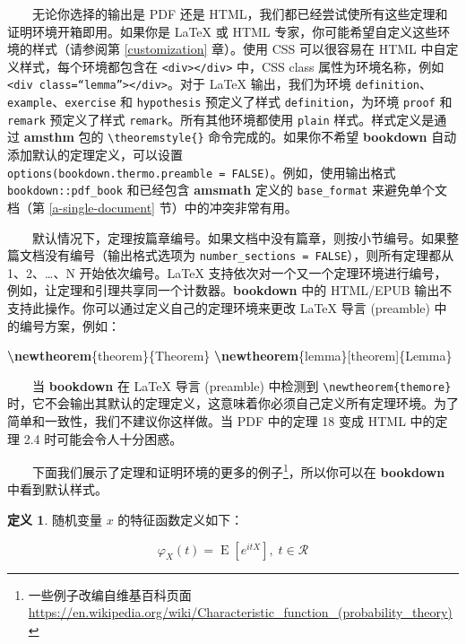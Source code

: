 \documentclass[
  12pt,
]{krantz}
\newenvironment{Shaded}{\begin{snugshade}}{\end{snugshade}}
\newcommand{\FunctionTok}[1]{\textcolor[rgb]{0.13,0.29,0.53}{\textbf{#1}}}
\newcommand{\NormalTok}[1]{#1}
\theoremstyle{definition}
\newtheorem{definition}{定义}[chapter]
\theoremstyle{definition}
\theoremstyle{definition}
\theoremstyle{definition}
\theoremstyle{remark}
\begin{document}
  无论你选择的输出是 PDF 还是 HTML，我们都已经尝试使所有这些定理和证明环境开箱即用。如果你是 LaTeX 或 HTML 专家，你可能希望自定义这些环境的样式（请参阅第 \ref{customization} 章）。使用 CSS 可以很容易在 HTML 中自定义样式，每个环境都包含在 \texttt{\textless{}div\textgreater{}\textless{}/div\textgreater{}} 中，CSS class 属性为环境名称，例如 \texttt{\textless{}div\ class=“lemma”\textgreater{}\textless{}/div\textgreater{}}。对于 LaTeX 输出，我们为环境 \texttt{definition}、\texttt{example}、\texttt{exercise} 和 \texttt{hypothesis} 预定义了样式 \texttt{definition}，为环境 \texttt{proof} 和 \texttt{remark} 预定义了样式 \texttt{remark}。所有其他环境都使用 \texttt{plain} 样式。样式定义是通过 \textbf{amsthm} 包的 \texttt{\textbackslash{}theoremstyle\{\}} 命令完成的。如果你不希望 \textbf{bookdown} 自动添加默认的定理定义，可以设置 \texttt{options(bookdown.thermo.preamble\ =\ FALSE)}。例如，使用输出格式 \texttt{bookdown::pdf\_book} 和已经包含 \textbf{amsmath} 定义的 \texttt{base\_format} 来避免单个文档（第 \ref{a-single-document} 节）中的冲突非常有用。

  默认情况下，定理按篇章编号。如果文档中没有篇章，则按小节编号。如果整篇文档没有编号（输出格式选项为 \texttt{number\_sections\ =\ FALSE}），则所有定理都从 1、2、\ldots、N 开始依次编号。LaTeX 支持依次对一个又一个定理环境进行编号，例如，让定理和引理共享同一个计数器。\textbf{bookdown} 中的 HTML/EPUB 输出不支持此操作。你可以通过定义自己的定理环境来更改 LaTeX 导言 (preamble) 中的编号方案，例如：

\begin{Shaded}
\begin{Highlighting}[]
\FunctionTok{\textbackslash{}newtheorem}\NormalTok{\{theorem\}\{Theorem\}}
\FunctionTok{\textbackslash{}newtheorem}\NormalTok{\{lemma\}[theorem]\{Lemma\}}
\end{Highlighting}
\end{Shaded}

  当 \textbf{bookdown} 在 LaTeX 导言 (preamble) 中检测到 \texttt{\textbackslash{}newtheorem\{themore\}} 时，它不会输出其默认的定理定义，这意味着你必须自己定义所有定理环境。为了简单和一致性，我们不建议你这样做。当 PDF 中的定理 18 变成 HTML 中的定理 2.4 时可能会令人十分困惑。

  下面我们展示了定理和证明环境的更多的例子\footnote{一些例子改编自维基百科页面 \url{https://en.wikipedia.org/wiki/Characteristic_function_(probability_theory)}}，所以你可以在 \textbf{bookdown} 中看到默认样式。

\begin{definition}
随机变量 \(x\) 的特征函数定义如下：

\[\varphi _{X}(t)=\operatorname {E} \left[e^{itX}\right], \; t\in\mathcal{R}\]
\end{definition}
\end{document}
